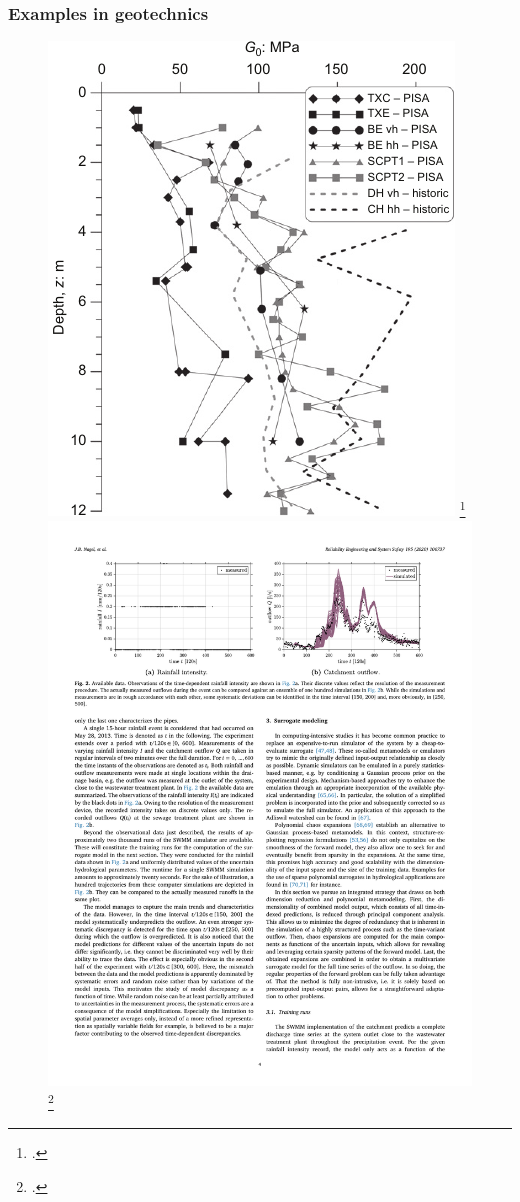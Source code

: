 \begin{frame}
\frametitle{Examples in geotechnics}
    \begin{figure}
    \centering
    \includegraphics[scale=0.7]{figures/figure-UQtype2.pdf}
    \tiny\footcite{zdravkovic2020}
    \hspace{1cm}
    \includegraphics[scale=0.8]{figures/figure-UQtype3.pdf}
    \tiny\footcite{nagel2020}  
    \end{figure}
\end{frame}
